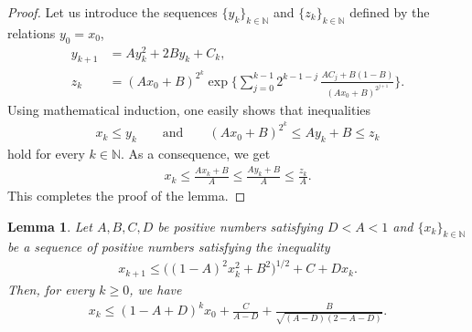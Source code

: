\documentclass[aoap,preprint,reqno,a4paper]{imsart} %
\newcommand{\NN}{\mathbb{N}}
\newtheorem{lemma}{Lemma}
\begin{document}
\begin{proof}
Let us introduce the sequences $\{y_k\}_{k\in\NN}$ and $\{z_k\}_{k\in\NN}$
defined by the relations $y_0=x_0$,
\begin{align}
y_{k+1} &= Ay_k^2+2By_k+C_k,\\
z_k     &= (Ax_0+B)^{2^k}\exp\bigg\{\sum_{j=0}^{k-1} 2^{k-1-j}\,
		\frac{AC_j+B(1-B)}{(Ax_0+B)^{2^{j+1}}}\bigg\}.
\end{align}
Using mathematical induction, one easily shows that inequalities
\begin{align}
x_k\le y_k\qquad \text{and}\qquad  (Ax_0+B)^{2^k}\le Ay_k+B \le z_k
\end{align}
hold for every $k\in\NN$. As a consequence, we get
\begin{align}
x_{k}\le \frac{Ax_k+B}{A}\le \frac{Ay_k+B}{A}\le \frac{z_k}A.
\end{align}
This completes the proof of the lemma.
\end{proof}


\begin{lemma}\label{lemI}
Let $A,B,C,D$ be positive numbers satisfying $D<A<1$ and $\{x_k\}_{k\in\NN}$
be a sequence of positive numbers satisfying the inequality
\begin{align}
x_{k+1} \le \big((1-A)^2x_k^2+B^2\big)^{1/2}+C+Dx_k.
\end{align}
Then, for every $k\ge 0$, we have
\begin{align}
x_k\le (1-A+D)^k x_0 + \frac{C}{A-D}+\frac{B}{\sqrt{(A-D)(2-A-D)}}.
\end{align}
\end{lemma}
\end{document}

